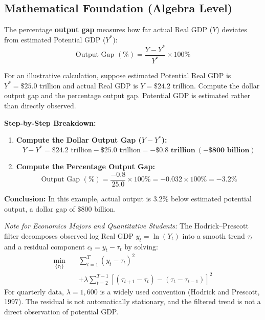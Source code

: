 \documentclass[11pt,letterpaper]{article}
\begin{document}
\subsection*{Mathematical Foundation (Algebra Level)}
The percentage \textbf{output gap} measures how far actual Real GDP ($Y$) deviates from estimated Potential GDP ($Y^*$):
\begin{equation}
\text{Output Gap } (\%) = \frac{Y - Y^*}{Y^*} \times 100\%
\end{equation}

\begin{tcolorbox}[colback=LightSlate,colframe=CourseTeal,title=\textbf{Work It Out: Measuring a Negative Output Gap}]
For an illustrative calculation, suppose estimated Potential Real GDP is $Y^*=\$25.0$ trillion and actual Real GDP is $Y=\$24.2$ trillion. Compute the dollar output gap and the percentage output gap. Potential GDP is estimated rather than directly observed.

\noindent\textbf{Step-by-Step Breakdown:}
\begin{enumerate}
    \item \textbf{Compute the Dollar Output Gap ($Y - Y^*$):}
    \[
    Y - Y^* = \$24.2\text{ trillion} - \$25.0\text{ trillion} = \mathbf{-\$0.8\text{ trillion}\ (-\$800\text{ billion})}
    \]

    \item \textbf{Compute the Percentage Output Gap:}
    \[
    \text{Output Gap } (\%) = \frac{-0.8}{25.0} \times 100\% = -0.032 \times 100\% = \mathbf{-3.2\%}
    \]
\end{enumerate}
\textbf{Conclusion:} In this example, actual output is $3.2\%$ below estimated potential output, a dollar gap of $\$800$ billion.
\end{tcolorbox}

\begin{tcolorbox}[colback=LightSlate,colframe=CourseBlue,title=\textbf{Optional Advanced Section: Hodrick-Prescott Trend Decomposition}]
\small
\emph{Note for Economics Majors and Quantitative Students:}
The Hodrick--Prescott filter decomposes observed log Real GDP $y_t=\ln(Y_t)$ into a smooth trend $\tau_t$ and a residual component $c_t=y_t-\tau_t$ by solving:
\[
\begin{aligned}
\min_{\{\tau_t\}} \quad
&\sum_{t=1}^{T} (y_t - \tau_t)^2 \\
&+ \lambda \sum_{t=2}^{T-1}
\left[ (\tau_{t+1} - \tau_t) - (\tau_t - \tau_{t-1}) \right]^2
\end{aligned}
\]
For quarterly data, $\lambda=1{,}600$ is a widely used convention (Hodrick and Prescott, 1997). The residual is not automatically stationary, and the filtered trend is not a direct observation of potential GDP.
\end{tcolorbox}
\end{document}
